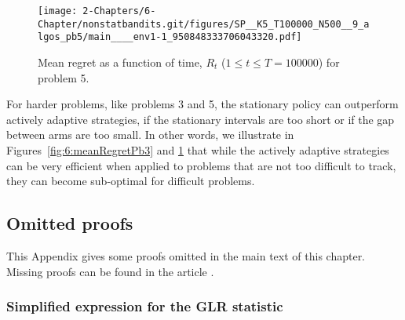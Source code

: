 \begin{figure}[h!]  %
    \centering
    \texttt{[image: 2-Chapters/6-Chapter/nonstatbandits.git/figures/SP\_\_K5\_T100000\_N500\_\_9\_algos\_pb5/main\_\_\_\_env1-1\_950848333706043320.pdf]}
    \caption{Mean regret as a function of time, $R_t$ ($1 \leq t \leq T = 100000$) for problem 5.}
    \label{fig:6:meanRegretPb5}
\end{figure}


For harder problems, like problems 3 and 5, the stationary policy \klUCB{} can outperform actively adaptive strategies, if the stationary intervals are too short or if the gap between arms are too small.
In other words, we illustrate in Figures~\ref{fig:6:meanRegretPb3} and \ref{fig:6:meanRegretPb5} that while the actively adaptive strategies can be very efficient when applied to problems that are not too difficult to track, they can become sub-optimal for difficult problems.


\subsection{Omitted proofs}\label{proof:6:Conc}

This Appendix gives some proofs omitted in the main text of this chapter.
Missing proofs can be found in the article \cite{Besson2019GLRT}.


\subsubsection{Simplified expression for the GLR statistic}\label{app:6:GLR_with_kl}


